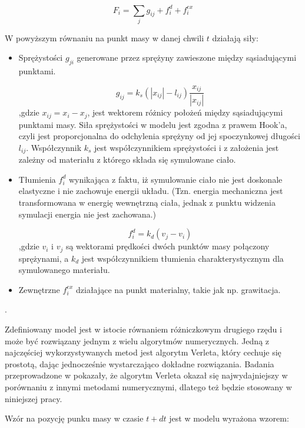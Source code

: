 %
%
\begin{equation}
F_{i} = \sum_{j} g_{ij} + f^{d}_i + f^{ex}_{i}
\end{equation}

W powyższym równaniu na punkt masy w danej chwili $t$ działają siły:
\begin{itemize}
\item  Sprężystości $g_{ji}$ generowane przez sprężyny zawieszone między sąsiadującymi punktami.

\begin{equation}
g_{ij} = k_s (| x_{ij}| - l_{ij})\frac{x_{ij}}{|x_{ij}|}
\end{equation}
,gdzie $x_{ij} = x_i - x_j$, jest wektorem różnicy położeń między sąsiadującymi punktami masy. Siła sprężystości w modelu jest zgodna z prawem Hook'a, czyli jest proporcjonalna do odchylenia sprężyny od jej spoczynkowej długości $l_{ij}$. Współczynnik $k_s$ jest współczynnikiem sprężystości i z założenia jest zależny od materiału z którego składa się symulowane ciało.

\item Tłumienia $f^{d}_i$ wynikająca z faktu, iż symulowanie ciało nie jest doskonale elastyczne i nie zachowuje energii układu. (Tzn. energia mechaniczna jest transformowana w energię wewnętrzną ciała, jednak z punktu widzenia symulacji energia nie jest zachowana.)

\begin{equation}
f^{d}_i = k_d(v_j - v_i)
\end{equation}
,gdzie $v_i$ i $v_j$ są wektorami prędkości dwóch punktów masy połączony sprężynami, a $ k_d$ jest współczynnikiem tłumienia charakterystycznym dla symulowanego materiału.

\item Zewnętrzne $f^{ex}_{i}$ działające na punkt materialny, takie jak np. grawitacja.
\end{itemize}. 

Zdefiniowany model jest w istocie równaniem różniczkowym drugiego rzędu i może
być rozwiązany jednym z wielu algorytmów numerycznych. Jedną z najczęściej
wykorzystywanych metod jest algorytm Verleta, który cechuje się prostotą, dając
jednocześnie wystarczająco dokładne rozwiązania. Badania przeprowadzone w \cite{var} pokazały, że algorytm Verleta okazał się najwydajniejszy w porównaniu z innymi metodami numerycznymi, dlatego też będzie stosowany w niniejszej pracy.

Wzór na pozycję punku masy w czasie $t + dt$ jest w modelu wyrażona wzorem:

